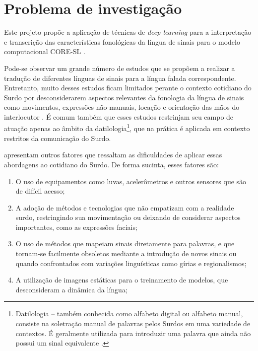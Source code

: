 

\maketitle

\section{Problema de investigação}
\label{sec:problema-investigacao}

Este projeto propõe a aplicação de técnicas de \textit{deep learning} para a interpretação e transcrição das características fonológicas da língua de sinais para o modelo computacional CORE-SL \cite{antunes-2015}. 

Pode-se observar um grande número de estudos que se propõem a realizar a tradução de diferentes línguas de sinais para a língua falada correspondente. Entretanto, muito desses estudos ficam limitados perante o contexto cotidiano do Surdo por desconsiderarem aspectos relevantes da fonologia da língua de sinais como movimentos, expressões não-manuais, locação e orientação das mãos do interlocutor \cite{quadros-2004}. É comum também que esses estudos restrinjam seu campo de atuação apenas ao âmbito da datilologia\footnote{
Datilologia – também conhecida como alfabeto digital ou alfabeto manual, consiste na soletração manual de palavras pelos Surdos em uma variedade de contextos. É geralmente utilizada para introduzir uma palavra que ainda não possui um sinal equivalente \cite{quadros-2004}\cite{pereira-choi-2011}.
}, que na prática é aplicada em contexto restritos da comunicação do Surdo.

\textcite{antunes-hcisl-2011} apresentam outros fatores que ressaltam as dificuldades de aplicar essas abordagens ao cotidiano do Surdo. De forma sucinta, esses fatores são: 
\begin{enumerate}
\item O uso de equipamentos como luvas, acelerômetros e outros sensores que são de difícil acesso; 
\item A adoção de métodos e tecnologias que não empatizam com a realidade surdo, restringindo sua movimentação ou deixando de considerar aspectos importantes, como as expressões faciais;
\item O uso de métodos que mapeiam sinais diretamente para palavras, e que tornam-se facilmente obsoletos mediante a introdução de novos sinais ou quando confrontados com variações linguísticas como gírias e regionalismos; 
\item A utilização de imagens estáticas para o treinamento de modelos, que desconsideram a dinâmica da língua; 
\end{enumerate}

